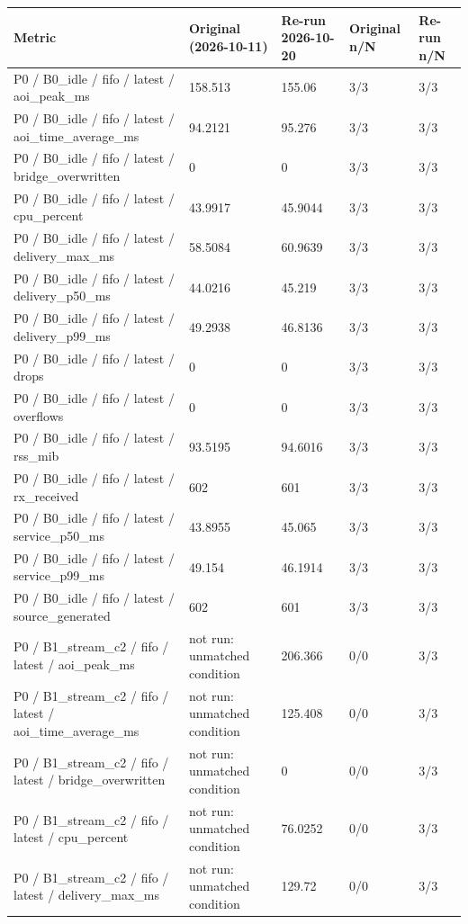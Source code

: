 \begin{tabular}{@{}lllll@{}}
\toprule
Metric & Original (2026-10-11) & Re-run 2026-10-20 & Original n/N & Re-run n/N \\
\midrule
P0 / B0\_idle / fifo / latest / aoi\_peak\_ms & 158.513 & 155.06 & 3/3 & 3/3 \\
P0 / B0\_idle / fifo / latest / aoi\_time\_average\_ms & 94.2121 & 95.276 & 3/3 & 3/3 \\
P0 / B0\_idle / fifo / latest / bridge\_overwritten & 0 & 0 & 3/3 & 3/3 \\
P0 / B0\_idle / fifo / latest / cpu\_percent & 43.9917 & 45.9044 & 3/3 & 3/3 \\
P0 / B0\_idle / fifo / latest / delivery\_max\_ms & 58.5084 & 60.9639 & 3/3 & 3/3 \\
P0 / B0\_idle / fifo / latest / delivery\_p50\_ms & 44.0216 & 45.219 & 3/3 & 3/3 \\
P0 / B0\_idle / fifo / latest / delivery\_p99\_ms & 49.2938 & 46.8136 & 3/3 & 3/3 \\
P0 / B0\_idle / fifo / latest / drops & 0 & 0 & 3/3 & 3/3 \\
P0 / B0\_idle / fifo / latest / overflows & 0 & 0 & 3/3 & 3/3 \\
P0 / B0\_idle / fifo / latest / rss\_mib & 93.5195 & 94.6016 & 3/3 & 3/3 \\
P0 / B0\_idle / fifo / latest / rx\_received & 602 & 601 & 3/3 & 3/3 \\
P0 / B0\_idle / fifo / latest / service\_p50\_ms & 43.8955 & 45.065 & 3/3 & 3/3 \\
P0 / B0\_idle / fifo / latest / service\_p99\_ms & 49.154 & 46.1914 & 3/3 & 3/3 \\
P0 / B0\_idle / fifo / latest / source\_generated & 602 & 601 & 3/3 & 3/3 \\
P0 / B1\_stream\_c2 / fifo / latest / aoi\_peak\_ms & not run: unmatched condition & 206.366 & 0/0 & 3/3 \\
P0 / B1\_stream\_c2 / fifo / latest / aoi\_time\_average\_ms & not run: unmatched condition & 125.408 & 0/0 & 3/3 \\
P0 / B1\_stream\_c2 / fifo / latest / bridge\_overwritten & not run: unmatched condition & 0 & 0/0 & 3/3 \\
P0 / B1\_stream\_c2 / fifo / latest / cpu\_percent & not run: unmatched condition & 76.0252 & 0/0 & 3/3 \\
P0 / B1\_stream\_c2 / fifo / latest / delivery\_max\_ms & not run: unmatched condition & 129.72 & 0/0 & 3/3 \\

\end{tabular}
